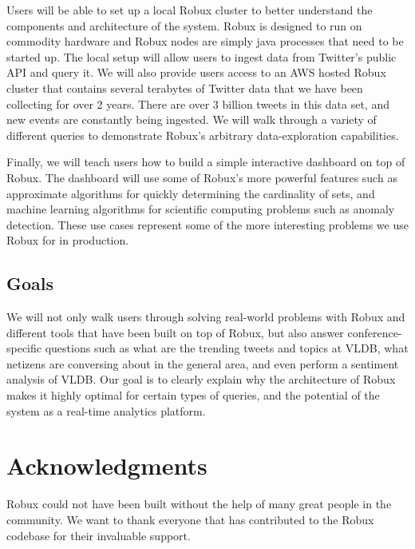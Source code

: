 \documentclass{vldb}
\begin{document}
Users will be able to set up a local Robux cluster to better understand the
components and architecture of the system. Robux is designed to run on
commodity hardware and Robux nodes are simply java processes that need to be
started up. The local setup will allow users to ingest data from Twitter's
public API and query it.  We will also provide users access to an AWS hosted
Robux cluster that contains several terabytes of Twitter data that we have been
collecting for over 2 years. There are over 3 billion tweets in this data set,
and new events are constantly being ingested. We will walk through a variety of
different queries to demonstrate Robux's arbitrary data-exploration
capabilities.

Finally, we will teach users how to build a simple interactive dashboard on top
of Robux. The dashboard will use some of Robux's more powerful features such as
approximate algorithms for quickly determining the cardinality of sets, and
machine learning algorithms for scientific computing problems such as anomaly
detection.  These use cases represent some of the more interesting problems we
use Robux for in production.

\subsection{Goals}

We will not only walk users through solving real-world problems with Robux and
different tools that have been built on top of Robux, but also answer
conference-specific questions such as what are the trending tweets and topics
at VLDB, what netizens are conversing about in the general area, and even
perform a sentiment analysis of VLDB. Our goal is to clearly explain why the
architecture of Robux makes it highly optimal for certain types of queries, and
the potential of the system as a real-time analytics platform.


\balance

\section{Acknowledgments}
Robux could not have been built without the help of many great people in the
community.  We want to thank everyone that has contributed to the Robux
codebase for their invaluable support.


\end{document}
